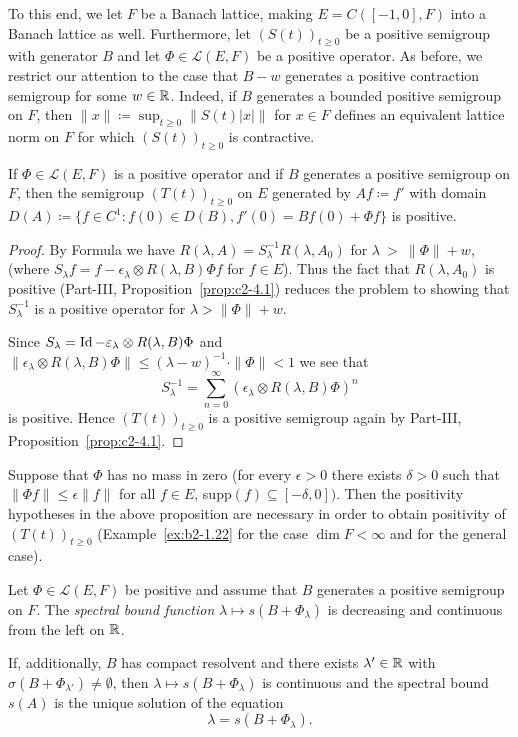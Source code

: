 To this end, we let $F$ be a Banach lattice, making $E = C([-1,0],F)$ into a Banach lattice as well. 
Furthermore, let $(S(t))_{t \geq 0}$ be a positive semigroup with generator $B$ and let $\Phi \in \mathcal{L}(E,F)$ be a positive operator. 
As before, we restrict our attention to the case that $B - w$ generates a positive contraction semigroup for some $w \in \mathbb{R}$. 
Indeed, if\/ $B$ generates a bounded positive semigroup on $F$, then $\|x\|  \coloneq  \sup_{t \geq 0}\|S(t)|x|\|$ for $x \in F$ defines an equivalent lattice norm on $F$ for which $(S(t))_{t \geq 0}$ is contractive.
\begin{proposition}\label{prop:b4-3.5}
	If\/ $\Phi \in \mathcal{L}(E,F)$ is a positive operator and if\/ $B$ generates a positive semigroup on $F$, then the semigroup $(T(t))_{t \geq 0}$ on $E$ generated by $Af  \coloneq  f'$ with domain $D(A)  \coloneq  \{f \in C^1 \colon f(0) \in D(B), f'(0) = Bf(0) + \Phi f\}$ is positive.
\end{proposition}
\begin{proof} By Formula  we have $R(\lambda,A) = S_\lambda^{-1}R(\lambda,A_{0})$ for $\lambda~>~\|\Phi\|+w$, (where $S_\lambda f = f - \epsilon_\lambda \otimes R(\lambda,B)\Phi f$ for $f \in E$). 
Thus the fact that $R(\lambda,A_{0})$ is positive (Part-III, Proposition~\ref{prop:c2-4.1}) reduces the problem to showing that $S_\lambda^{-1}$ is a positive operator for $\lambda > \|\Phi\|+w$.

Since $S_\lambda = \Id  - \epsilon_\lambda \otimes R(\lambda,B)\Phi$ and $\|\epsilon_\lambda \otimes R(\lambda,B)\Phi\| \leq (\lambda-w)^{-1} \cdot \|\Phi\| < 1$ we see that 
\[
S_\lambda^{-1} = \sum_{n=0}^{\infty}(\epsilon_\lambda \otimes R(\lambda,B)\Phi)^n
\]
is positive. 
Hence $(T(t))_{t \geq 0}$ is a positive semigroup again by Part-III, Proposition~\ref{prop:c2-4.1}.
\end{proof}
\begin{remark*}
Suppose that $\Phi$ has no mass in zero (\ie  for every $\epsilon > 0$ there exists $\delta > 0$ such that $\|\Phi f\| \leq \epsilon \|f\|$ for all $f \in E$, supp$(f) \subseteq [-\delta,0])$. 
Then the positivity hypotheses in the above proposition are necessary in order to obtain positivity of\/ $(T(t))_{t \geq 0}$ (\cf Example~\ref{ex:b2-1.22} for the case $\dim F < \infty$ and \textcite{kerscher:1986} for the general case).
\end{remark*}
\begin{proposition}\label{prop:b4-3.6}
	Let $\Phi \in \mathcal{L}(E,F)$ be positive and assume that $B$ generates a positive semigroup on $F$. 
    The \emph{spectral bound function} $\lambda \mapsto s(B + \Phi_\lambda)$ is decreasing and continuous from the left on $\mathbb{R}$.
	
	If, additionally, $B$ has compact resolvent and there exists $\lambda' \in \mathbb{R}$ with $\sigma(B + \Phi_{\lambda'}) \neq \emptyset$, then $\lambda \mapsto s(B + \Phi_\lambda)$ is continuous and the spectral bound $s(A)$ is the unique solution of the equation
	\begin{equation}\label{eq:b4-3.5}
		\lambda = s(B + \Phi_\lambda) .
	\end{equation}
\end{proposition}
